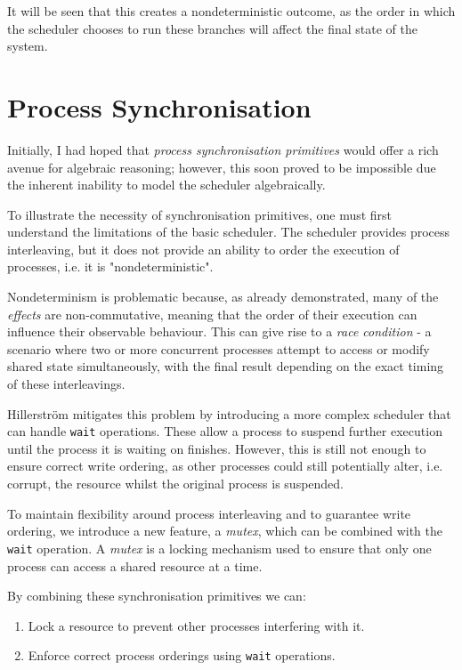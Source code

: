 \documentclass[logo,bsc,singlespacing,parskip]{infthesis}
\begin{document}
It will be seen that this creates a nondeterministic outcome, as the order in which the scheduler chooses to run these branches will affect the final state of the system. 



\section{Process Synchronisation}
\label{process-synchronisation}

Initially, I had hoped that \textit{process synchronisation primitives} would offer a rich avenue for algebraic reasoning; however, this soon proved to be impossible due the inherent inability to model the scheduler algebraically.

To illustrate the necessity of synchronisation primitives, one must first understand the limitations of the basic scheduler. The scheduler provides process interleaving, but it does not provide an ability to order the execution of processes, i.e. it is "nondeterministic". 

Nondeterminism is problematic because, as already demonstrated, many of the \textit{effects} are non-commutative, meaning that the order of their execution can influence their observable behaviour. This can give rise to a \textit{race condition} - a scenario where two or more concurrent processes attempt to access or modify shared state simultaneously, with the final result depending on the exact timing of these interleavings.

Hillerström mitigates this problem by introducing a more complex scheduler that can handle \lstinline{wait} operations. These allow a process to suspend further execution until the process it is waiting on finishes. However, this is still not enough to ensure correct write ordering, as other processes could still potentially alter, i.e. corrupt, the resource whilst the original process is suspended.  

To maintain flexibility around process interleaving and to guarantee write ordering, we introduce a new feature, a \textit{mutex}, which can be combined with the \lstinline{wait} operation. A \textit{mutex} is a locking mechanism used to ensure that only one process can access a shared resource at a time.


By combining these synchronisation primitives we can:
\begin{enumerate}
    \item Lock a resource to prevent other processes interfering with it.
    \item Enforce correct process orderings using \lstinline{wait} operations.
\end{enumerate}
\end{document}
